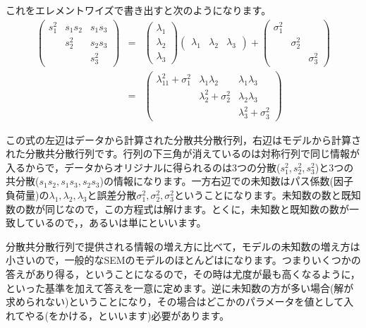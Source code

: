 \documentclass{ltjsbook}
\begin{document}
これをエレメントワイズで書き出すと次のようになります。
\begin{eqnarray*}
    \begin{pmatrix} s_1^2 & s_1s_2 & s_1s_3 \\
                      & s_2^2  & s_2s_3 \\
                      &        & s_3^2\end{pmatrix}
    &=& \begin{pmatrix} \lambda_1\\ \lambda_2 \\ \lambda_3 \end{pmatrix}\begin{pmatrix} \lambda_1 & \lambda_2 & \lambda_3 \end{pmatrix} + \begin{pmatrix} \sigma_1^2 & & \\ & \sigma_2^2 & \\ & & \sigma_3^2 \end{pmatrix} \\
    &=& \begin{pmatrix} \lambda_11^2 + \sigma_1^2 & \lambda_1\lambda_2       & \lambda_1 \lambda_3      \\
                                          & \lambda_2^2 + \sigma_2^2 & \lambda_2 \lambda_3      \\
                                          &                          & \lambda_3^2 + \sigma_3^2\end{pmatrix}
\end{eqnarray*}

この式の左辺はデータから計算された分散共分散行列，右辺はモデルから計算された分散共分散行列です。行列の下三角が消えているのは対称行列で同じ情報が入るからで，データからオリジナルに得られるのは3つの分散($s_1^2,s_2^2,s_3^2$)と3つの共分散($s_1s_2,s_1s_3,s_2s_3$)の情報になります。一方右辺での未知数はパス係数(因子負荷量)の$\lambda_1,\lambda_2,\lambda_3$と誤差分散$\sigma_1^2,\sigma_2^2,\sigma_3^2$ということになります。未知数の数と既知数の数が同じなので，この方程式は解けます。とくに，未知数と既知数の数が一致しているので，，あるいは単にといいます。

分散共分散行列で提供される情報の増え方に比べて，モデルの未知数の増え方は小さいので，一般的なSEMのモデルのほとんどはになります。つまりいくつかの答えがあり得る，ということになるので，その時は尤度が最も高くなるように，といった基準を加えて答えを一意に定めます。逆に未知数の方が多い場合(解が求められない)ということになり，その場合はどこかのパラメータを値として入れてやる(をかける，といいます)必要があります。
\end{document}
